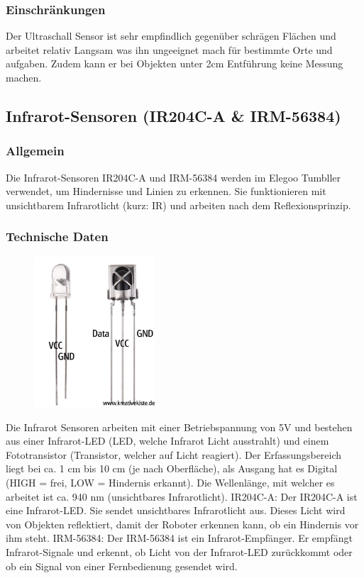 \subsubsection{Einschränkungen}
Der Ultraschall Sensor ist sehr empfindlich gegenüber schrägen Flächen und arbeitet relativ Langsam was ihn ungeeignet mach für bestimmte Orte und aufgaben. 
Zudem kann er bei Objekten unter 2cm Entführung keine Messung machen.
%
\subsection{Infrarot-Sensoren (IR204C-A \& IRM-56384)}
%
\subsubsection{Allgemein}
Die Infrarot-Sensoren IR204C-A und IRM-56384 werden im Elegoo Tumbller verwendet, um Hindernisse und Linien zu erkennen.
Sie funktionieren mit unsichtbarem Infrarotlicht (kurz: IR) und arbeiten nach dem Reflexionsprinzip.
\subsubsection{Technische Daten}
\begin{figure}[H]
    \includegraphics[width=0.4\textwidth, center]{img/Hardware/Infrarot_Sensor.png}
\end{figure}
Die Infrarot Sensoren arbeiten mit einer Betriebspannung von 5V und bestehen aus einer Infrarot-LED (LED, welche Infrarot Licht ausstrahlt) und 
einem Fototransistor (Transistor, welcher auf Licht reagiert). 
Der Erfassungsbereich liegt bei ca. 1 cm bis 10 cm (je nach Oberfläche), als Ausgang hat es Digital (HIGH = frei, LOW = Hindernis erkannt). 
Die Wellenlänge, mit welcher es arbeitet ist ca. 940 nm (unsichtbares Infrarotlicht).
IR204C-A:
Der IR204C-A ist eine Infrarot-LED. Sie sendet unsichtbares Infrarotlicht aus. 
Dieses Licht wird von Objekten reflektiert, damit der Roboter erkennen kann, ob ein Hindernis vor ihm steht.
IRM-56384:
Der IRM-56384 ist ein Infrarot-Empfänger. Er empfängt Infrarot-Signale und erkennt, ob Licht von der Infrarot-LED zurückkommt oder ob ein Signal von einer Fernbedienung gesendet wird.
